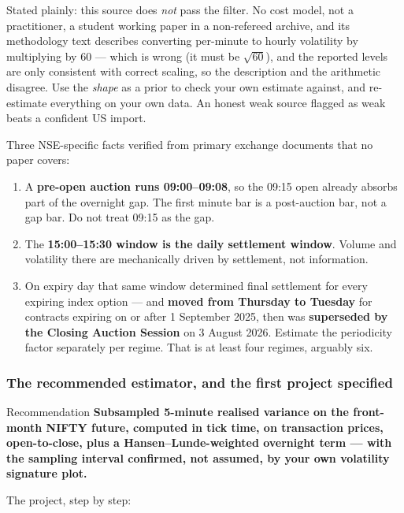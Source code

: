 \documentclass[11pt,a4paper]{article}
\newcommand{\srcnote}[1]{{\footnotesize\color{soft}#1\par}}
\begin{document}
\srcnote{Stated plainly: this source does \emph{not} pass the filter. No cost
model, not a practitioner, a student working paper in a non-refereed archive, and
its methodology text describes converting per-minute to hourly volatility by
multiplying by 60 --- which is wrong (it must be $\sqrt{60}$), and the reported
levels are only consistent with correct scaling, so the description and the
arithmetic disagree. Use the \emph{shape} as a prior to check your own estimate
against, and re-estimate everything on your own data. An honest weak source
flagged as weak beats a confident US import.}

Three NSE-specific facts verified from primary exchange documents that no paper covers:

\begin{enumerate}
\item A \textbf{pre-open auction runs 09:00--09:08}, so the 09:15 open already
absorbs part of the overnight gap. The first minute bar is a post-auction bar, not
a gap bar. Do not treat 09:15 as the gap.
\item The \textbf{15:00--15:30 window is the daily settlement window}. Volume and
volatility there are mechanically driven by settlement, not information.
\item On expiry day that same window determined final settlement for every
expiring index option --- and \textbf{moved from Thursday to Tuesday} for
contracts expiring on or after 1 September 2025, then was \textbf{superseded by
the Closing Auction Session} on 3 August 2026. Estimate the periodicity factor
separately per regime. That is at least four regimes, arguably six.
\end{enumerate}

\subsubsection{The recommended estimator, and the first project specified}
\label{sec:rvproject}

\begin{keyfact}{Recommendation}
\textbf{Subsampled 5-minute realised variance on the front-month NIFTY future,
computed in tick time, on transaction prices, open-to-close, plus a
Hansen--Lunde-weighted overnight term --- with the sampling interval confirmed,
not assumed, by your own volatility signature plot.}
\end{keyfact}

The project, step by step:
\end{document}

